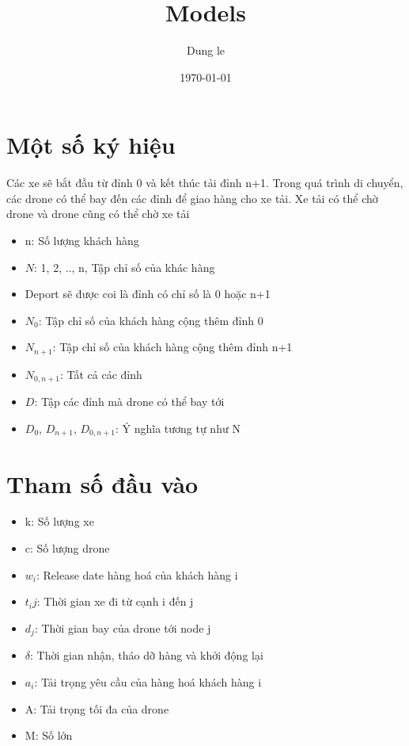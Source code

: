 \documentclass{article}
\begin{document}
\title{Models}
\author{Dung le}
\date{\today}

\maketitle

\section{Một số ký hiệu}
Các xe sẽ bắt đầu từ đỉnh 0 và kết thúc tải đỉnh n+1. Trong quá trình di chuyển, các drone có thể bay đến các đỉnh để giao hàng cho xe tải. Xe tải có thể chờ drone và drone cũng có thể chờ xe tải
\begin{itemize}
	\item n: Số lượng khách hàng
	\item $N$: {1, 2, .., n}, Tập chỉ số của khác hàng
	\item Deport sẽ được coi là đỉnh có chỉ số là 0 hoặc n+1
	\item $N_{0}$: Tập chỉ số của khách hàng cộng thêm đỉnh 0
	\item $N_{n+1}$: Tập chỉ số của khách hàng cộng thêm đỉnh n+1
	\item $N_{0,n+1}$: Tất cả các đỉnh
	\item $D$: Tập các đỉnh mà drone có thể bay tới
	\item $D_{0}$, $D_{n+1}$, $D_{0,n+1}$: Ý nghĩa tương tự như N
	
\end{itemize}

\section{Tham số đầu vào}

\begin{itemize}

  \item k: Số lượng xe
  \item c: Số lượng drone
  \item $w_i$: Release date hàng hoá của khách hàng i
  \item $t_ij$: Thời gian xe đi từ cạnh i đến j
  \item $d_j$: Thời gian bay của drone tới node j
  \item $\delta$: Thời gian nhận, tháo dỡ hàng và khởi động lại
  \item $a_i$: Tải trọng yêu cầu của hàng hoá khách hàng i
  \item A: Tải trọng tối đa của drone
  \item M: Số lớn
\end{itemize}
\end{document}
